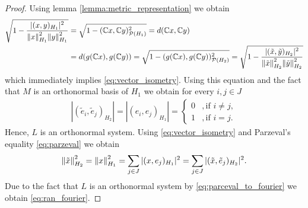 \begin{proof}
	Using lemma \ref{lemma:metric_representation} we obtain
	\begin{align*}
		\sqrt{1 - \dfrac{|(x,y)_{H_1}|^2}{\norm[H_1]{x}^2 \norm[H_1]{y}^2}} &= \sqrt{1 - (\C x,\C y)_{\mathcal{P}(H_1)}^2} = d(\C x,\C y) \\
		&= d\pbraces{g(\C x), g(\C y)} = \sqrt{1 - (g(\C x), g(\C y))_{\mathcal{P}(H_2)}^2} = \sqrt{1 - \dfrac{|(\tilde{x}, \tilde{y})_{H_2}|^2}{\norm[H_2]{\tilde{x}}^2 \norm[H_2]{\tilde{y}}^2}}
	\end{align*}
	which immediately implies \eqref{eq:vector_isometry}. Using this equation and the fact that $M$ is an orthonormal basis of $H_1$ we obtain for every $i,j \in J$ 
	\begin{align*}
	|(\tilde{e}_i, \tilde{e}_j)_{H_2}| = |(e_i, e_j)_{H_1}| = 
	\begin{cases}
	0 &, \text{if } i \neq j, \\
	1 &, \text{if } i = j.
	\end{cases}
	\end{align*}
	Hence, $L$ is an orthonormal system. Using \eqref{eq:vector_isometry} and Parzeval's equality \eqref{eq:parzeval} we obtain
	\begin{align*}
	\norm[H_2]{\tilde{x}}^2 = \norm[H_1]{x}^2 = \sum_{j \in J} |(x, e_j)_{H_1}|^2 = \sum_{j \in J} |(\tilde{x}, \tilde{e}_j)_{H_2}|^2.
	\end{align*}
	Due to the fact that $L$ is an orthonormal system by \eqref{eq:parceval_to_fourier} we obtain \eqref{eq:ran_fourier}.
\end{proof}